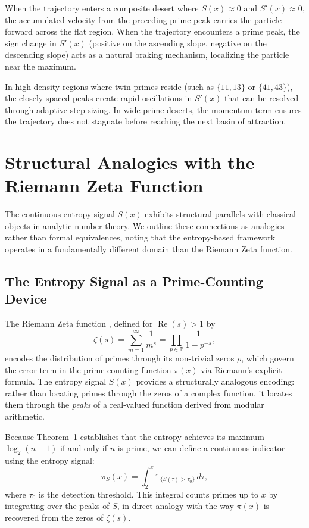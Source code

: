 \documentclass[11pt,twoside]{article}
\begin{document}
	When the trajectory enters a composite desert where $S(x) \approx 0$ and $S'(x) \approx 0$, the accumulated velocity from the preceding prime peak carries the particle forward across the flat region. When the trajectory encounters a prime peak, the sign change in $S'(x)$ (positive on the ascending slope, negative on the descending slope) acts as a natural braking mechanism, localizing the particle near the maximum.
	
	In high-density regions where twin primes reside (such as $\{11, 13\}$ or $\{41, 43\}$), the closely spaced peaks create rapid oscillations in $S'(x)$ that can be resolved through adaptive step sizing. In wide prime deserts, the momentum term ensures the trajectory does not stagnate before reaching the next basin of attraction.
	
	\section{Structural Analogies with the Riemann Zeta Function}
	
	The continuous entropy signal $S(x)$ exhibits structural parallels with classical objects in analytic number theory. We outline these connections as analogies rather than formal equivalences, noting that the entropy-based framework operates in a fundamentally different domain than the Riemann Zeta function.
	
	\subsection{The Entropy Signal as a Prime-Counting Device}
	The Riemann Zeta function \cite{ireland_rosen}, defined for $\operatorname{Re}(s) > 1$ by
	\begin{equation}
		\zeta(s) = \sum_{m=1}^{\infty} \frac{1}{m^s} = \prod_{p \in \mathbb{P}} \frac{1}{1 - p^{-s}},
	\end{equation}
	encodes the distribution of primes through its non-trivial zeros $\rho$, which govern the error term in the prime-counting function $\pi(x)$ via Riemann's explicit formula. The entropy signal $S(x)$ provides a structurally analogous encoding: rather than locating primes through the zeros of a complex function, it locates them through the \emph{peaks} of a real-valued function derived from modular arithmetic.
	
	Because Theorem~1 establishes that the entropy achieves its maximum $\log_2(n-1)$ if and only if $n$ is prime, we can define a continuous indicator using the entropy signal:
	\begin{equation}
		\pi_S(x) = \int_{2}^{x} \mathbb{1}_{\{S(\tau) > \tau_0\}} \, d\tau,
	\end{equation}
	where $\tau_0$ is the detection threshold. This integral counts primes up to $x$ by integrating over the peaks of $S$, in direct analogy with the way $\pi(x)$ is recovered from the zeros of $\zeta(s)$.
	
\end{document}
